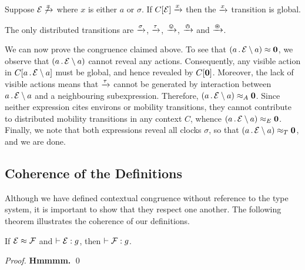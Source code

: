 \documentclass[orivec,envcountsame]{llncs}
\newcommand{\Eq}{\approx}
\newcommand{\EqA}{\mathrel{\Eq_{A}}}
\newcommand{\EqC}{\mathrel{\Eq_{T}}}
\newcommand{\EqE}{\mathrel{\Eq_{E}}}
\newcommand{\Does}[1]{\xderives{#1}}
\newcommand{\Theorem}{\vdash}
\newcommand{\OfType}{\mathrel{:}}
\begin{document}
\begin{proposition}
Suppose $\expr \not\Does{x}$ where $x$ is either $a$ or $\sigma$. If
$C[\expr] \Does{x}$ then the $\Does{x}$ transition is global.
\end{proposition}

\begin{proposition}
The only distributed transitions are $\Does{\sigma}$, $\Does{\tau}$,
$\Does{\tin}$, $\Does{\tout}$ and $\Does{\topen}$.
\end{proposition}

We can now prove the congruence claimed above. To see that
$\left(a\pref\expr \res{a}\right) \Eq \nil$, we observe that
$\left(a\,.\,\text{$\mathcal{E}$} \setminus {a}\right)$ cannot reveal any
actions. Consequently, any visible action in $C[a\,.\,\text{$\mathcal{E}$} \setminus {a}]$
must be global, and hence revealed by $C[\textbf{0}]$. Moreover, the lack of
visible actions means that $\Does{\tau}$ cannot be generated by
interaction between $a\,.\,\text{$\mathcal{E}$} \setminus {a}$ and a neighbouring
subexpression. Therefore, $\left(a\pref\expr \res{a}\right) \EqA
\nil$. Since neither expression cites environs or mobility transitions,
they cannot contribute to distributed mobility transitions in any
context $C$, whence $\left(a\pref\expr \res{a}\right) \EqE
\nil$. Finally, we note that both expressions reveal all clocks
$\sigma$, so that $\left(a\pref\expr \res{a}\right) \EqC \nil$, and we
are done.


\subsection{Coherence of the Definitions}
Although we have defined contextual congruence without reference to the
type system, it is important to show that they respect one another. The
following theorem illustrates the coherence of our definitions.

\begin{theorem}
If $\expr \Eq \exprb$ and $\Theorem \expr \OfType g$, then $\Theorem
\exprb \OfType g$.
\end{theorem}
\begin{proof}
\textbf{Hmmmm.} 
\qed \end{proof}



\end{document}
